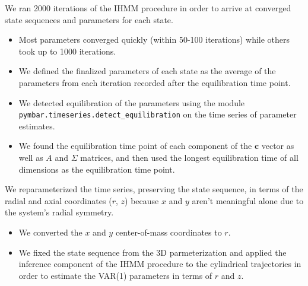 \documentclass{article}
\begin{document}
  We ran 2000 iterations of the IHMM procedure in order to arrive at converged 
  state sequences and parameters for each state.
  \begin{itemize}  
   \item Most parameters converged quickly (within 50-100 iterations) while
    others took up to 1000 iterations.
    \item We defined the finalized parameters of each state as the average
    of the parameters from each iteration recorded after the equilibration 
    time point.
    \item We detected equilibration of the parameters using the module 
    \texttt{pymbar.timeseries.detect\_equilibration} on the time series of 
    parameter estimates. 
    \item We found the equilibration time point of each component of the 
    $\mathbf{c}$ vector as well as $A$ and $\Sigma$ matrices, and then used the longest
    equilibration time of all dimensions as the equilibration time point.
  \end{itemize}
  
  We reparameterized the time series, preserving the state sequence, in terms
  of the radial and axial coordinates ($r$, $z$) because $x$ and $y$ aren't 
  meaningful alone due to the system's radial symmetry.
  \begin{itemize}
    \item We converted the $x$ and $y$ center-of-mass coordinates to $r$.
    \item We fixed the state sequence from the 3D parmeterization and applied the
    inference component of the IHMM procedure to the cylindrical trajectories in
    order to estimate the VAR(1) parameters in terms of $r$ and $z$.
  \end{itemize} 
  
\end{document}
